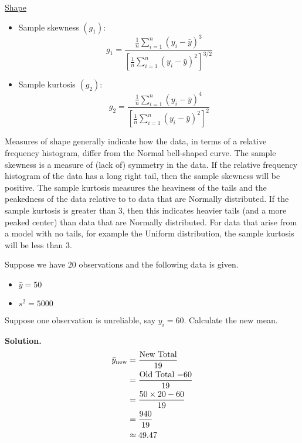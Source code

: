 \underline{Shape}
\begin{itemize}
    \item Sample skewness $ (g_1) $:
          \[g_{1}=\frac{\frac{1}{n}
                  \sum_{i=1}^{n}\left(y_{i}-\bar{y}\right)^{3}}{\left[\frac{1}{n} \sum_{i=1}^{n}\left(y_{i}-\bar{y}\right)^{2}\right]^{3 / 2}}\]
    \item Sample kurtosis $ (g_2) $:
          \[g_{2}=\frac{\frac{1}{n} \sum_{i=1}^{n}\left(y_{i}-\bar{y}\right)^{4}}{\left[\frac{1}{n} \sum_{i=1}^{n}\left(y_{i}-\bar{y}\right)^{2}\right]^{2}}\]
\end{itemize}
Measures of shape generally indicate how the data, in terms of a relative frequency
histogram, differ from the Normal bell-shaped curve. The sample skewness is a measure
of (lack of) symmetry in the data. If the relative frequency histogram
of the data has a long right tail, then the sample skewness will be positive.
The sample kurtosis measures the heaviness of the tails and the peakedness of the data
relative to to data that are Normally distributed. If the sample kurtosis is greater than 3,
then this indicates heavier tails (and a more peaked center) than data that are Normally distributed.
For data that arise from a model with no tails, for example the Uniform distribution, the sample
kurtosis will be less than 3.

\begin{exbox}
    \begin{example}
        Suppose we have $ 20 $ observations and the following data is given.
        \begin{itemize}
            \item $ \bar{y}=50 $
            \item $ s^2=5000 $
        \end{itemize}
        Suppose one observation is unreliable, say $ y_i=60 $. Calculate
        the new mean.
        
        \textbf{Solution.}
        \begin{align*}
            \bar{y}_{\text{new}}
             & =\frac{\text{New Total}}{19}          \\
             & =\frac{\text{Old Total $ - 60 $}}{19} \\
             & =\frac{50\times 20-60}{19}            \\
             & =\frac{940}{19}                       \\
             & \approx 49.47
        \end{align*}
    \end{example}
\end{exbox}

